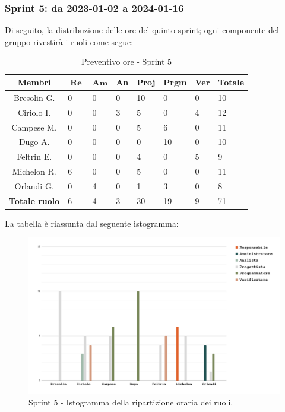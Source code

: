 \documentclass[10pt, a4paper]{article}
\begin{document}
{{{{{{{{{{{{\subsubsection{Sprint 5: da 2023-01-02 a 2024-01-16}
Di seguito, la distribuzione delle ore del quinto sprint; ogni componente del gruppo rivestirà i ruoli come segue:
\begin{table}[H]
\begin{tabularx}{\textwidth}{c|X|X|X|X|X|X|X}
        \textbf{Membri} & $\operatorname{\textbf{Re}}$ & $\mathrm{\textbf{Am}}$ & \textbf{An} & \textbf{Proj} & \textbf{Prgm} & \textbf{Ver} & \textbf{Totale} \\
        \hline Bresolin G. & 0 & 0 & 0 & \cellcolor{primarycolor}10 & 0 & 0 & 10 \\
        \hline Ciriolo I.  & 0 & 0 & 3 & \cellcolor{primarycolor}5 & 0 & 4 & 12 \\
        \hline Campese M.  & 0 & 0 & 0 & \cellcolor{primarycolor}5 & 6 & 0 & 11 \\
        \hline Dugo A.     & 0 & 0 & 0 & 0 & \cellcolor{primarycolor}10 & 0 & 10 \\
        \hline Feltrin E.  & 0 & 0 & 0 & 4 & 0 & \cellcolor{primarycolor}5 & 9 \\
        \hline Michelon R. & \cellcolor{primarycolor}6 & 0 & 0 & 5 & 0 & 0 & 11 \\
        \hline Orlandi G.  & 0 & \cellcolor{primarycolor}4 & 0 & 1 & 3 & 0 & 8 \\
        \hline
        \textbf{Totale ruolo} & 6 & 4 & 3 & 30 & 19 & 9 & 71 
    \end{tabularx}
    \caption{Preventivo ore - Sprint 5}
    \end{table}

La tabella è riassunta dal seguente istogramma:
 \begin{figure}[H]
        \centering        
        \includegraphics[width=15.5cm]{istogrammi/istogramma_5_periodo.png}
        \caption{Sprint 5 - Istogramma della ripartizione oraria dei ruoli. }
    \end{figure}

}}}}}}}}}}}}
\end{document}

